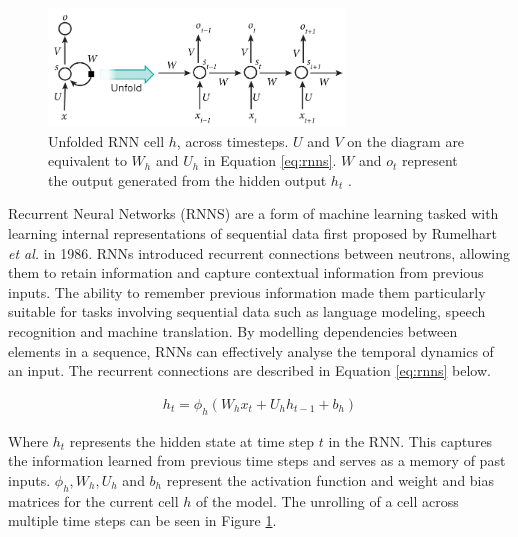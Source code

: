 \begin{figure}[H]
    \centering
    \includegraphics[width=0.7\textwidth]{graphs/rnn.png}
    \caption{Unfolded RNN cell $h$, across timesteps. $U$ and $V$ on the diagram are equivalent to $W_{h}$ and $U_{h}$ in Equation \ref{eq:rnns}. $W$ and $o_{t}$ represent the output generated from the hidden output $h_{t}$ \cite{RNN_diagram}.}
    \label{fig:rnn}
\end{figure}

Recurrent Neural Networks (RNNS) are a form of machine learning tasked with learning internal representations of sequential data first proposed by Rumelhart \textit{et al.} \cite{rnns} in 1986. RNNs introduced recurrent connections between neutrons, allowing them to retain information and capture contextual information from previous inputs. The ability to remember previous information made them particularly suitable for tasks involving sequential data such as language modeling, speech recognition and machine translation. By modelling dependencies between elements in a sequence, RNNs can effectively analyse the temporal dynamics of an input. The recurrent connections are described in Equation \ref{eq:rnns} below.

\begin{equation}
    \begin{gathered}
        h_{t} = \phi_{h}\left( W_{h}x_{t} + U_{h}h_{t-1} + b_{h} \right)
    \end{gathered}
    \label{eq:rnns}
\end{equation}

Where $h_{t}$ represents the hidden state at time step $t$ in the RNN. This captures the information learned from previous time steps and serves as a memory of past inputs. $\phi_{h}, W_{h}, U_{h}$ and $b_{h}$ represent the activation function and weight and bias matrices for the current cell $h$ of the model. The unrolling of a cell across multiple time steps can be seen in Figure \ref{fig:rnn}.

